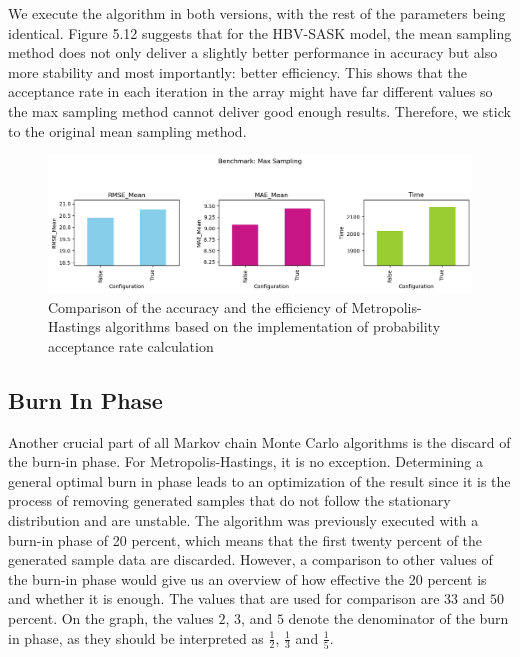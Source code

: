 We execute the algorithm in both versions, with the rest of the parameters being identical. Figure 5.12 suggests that for the HBV-SASK model, the mean sampling method does not only deliver a slightly better performance in accuracy but also more stability and most importantly: better efficiency. This shows that the acceptance rate in each iteration in the array might have far different values so the max sampling method cannot deliver good enough results. Therefore, we stick to the original mean sampling method.


\begin{figure}[H]
    \centering
    \includegraphics[width=1\textwidth]{figures/basic_mh/benchmark/max_sampling.png}
    \captionsetup{width=.8\textwidth}
    \caption{Comparison of the accuracy and the efficiency of Metropolis-Hastings algorithms based on the implementation of probability acceptance rate calculation}
    \label{fig:enter-label}
\end{figure}



\subsection{Burn In Phase}
Another crucial part of all Markov chain Monte Carlo algorithms is the discard of the burn-in phase. For Metropolis-Hastings, it is no exception. Determining a general optimal burn in phase leads to an optimization of the result since it is the process of removing generated samples that do not follow the stationary distribution and are unstable. The algorithm was previously executed with a burn-in phase of 20 percent, which means that the first twenty percent of the generated sample data are discarded. However, a comparison to other values of the burn-in phase would give us an overview of how effective the 20 percent is and whether it is enough. The values that are used for comparison are $33$ and $50$ percent. On the graph, the values $2$, $3$, and $5$ denote the denominator of the burn in phase, as they should be interpreted as $\frac 1 2$, $\frac 1 3$ and $\frac 1 5$.


